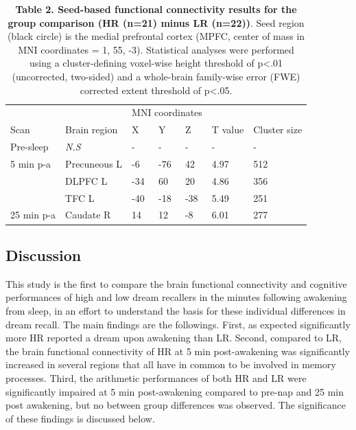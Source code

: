 \begin{table}[!htbp]
    \caption*{\textbf{Table 2. Seed-based functional connectivity results for the group comparison (HR (n=21) minus LR (n=22))}. Seed region (black circle) is the medial prefrontal cortex (MPFC, center of mass in MNI coordinates = 1, 55, -3). Statistical analyses were performed using a cluster-defining voxel-wise height threshold of p<.01 (uncorrected, two-sided) and a whole-brain family-wise error (FWE) corrected extent threshold of p<.05.}
    \begin{tabularx}{\textwidth}{lXlllXX}
    \toprule
                &              & \multicolumn{3}{l}{MNI coordinates} &              &              \\
    Scan        & Brain region & X          & Y          & Z         & T value      & Cluster size \\ \midrule
    Pre-sleep   & \textit{N.S} & -          & -          & -         & -            & -            \\
    5 min p-a   & Precuneous L & -6         & -76        & 42        & 4.97         & 512          \\
                & DLPFC L      & -34        & 60         & 20        & 4.86         & 356          \\
                & TFC L        & -40        & -18        & -38       & 5.49         & 251          \\
    25 min p-a  & Caudate R    & 14         & 12         & -8        & 6.01         & 277          \\ \bottomrule
    \end{tabularx}
\end{table}

\subsection*{Discussion}
\label{res:inertia:drf:discussion}

This study is the first to compare the brain functional connectivity and cognitive performances of high and low dream recallers in the minutes following awakening from sleep, in an effort to understand the basis for these individual differences in dream recall. The main findings are the followings. First, as expected significantly more HR reported a dream upon awakening than LR. Second, compared to LR, the brain functional connectivity of HR at 5 min post-awakening was significantly increased in several regions that all have in common to be involved in memory processes. Third, the arithmetic performances of both HR and LR were significantly impaired at 5 min post-awakening compared to pre-nap and 25 min post awakening, but no between group differences was observed. The significance of these findings is discussed below.


